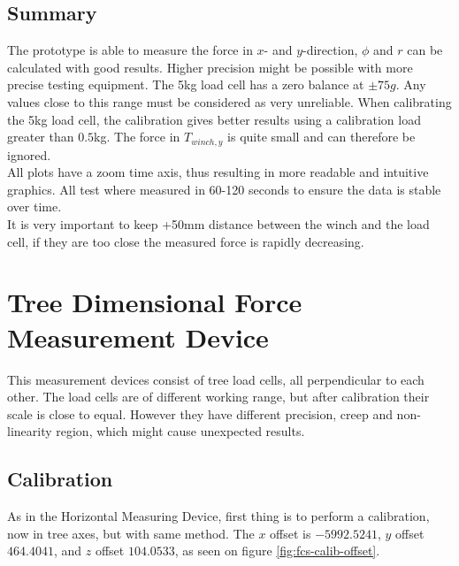 \newpage
\subsection{Summary}
The prototype is able to measure the force in $x$- and $y$-direction, $\phi$ and $r$ can be calculated with good results. Higher precision might be possible with more precise testing equipment.
The 5kg load cell has a zero balance at $\pm75g$. Any values close to this range must be considered as very unreliable. 
When calibrating the 5kg load cell, the calibration gives better results using a calibration load greater than $0.5$kg.
The force in $T_{winch,y}$ is quite small and can therefore be ignored.\\
All plots have a zoom time axis, thus resulting in more readable and intuitive graphics. All test where measured in 60-120 seconds to ensure the data is stable over time.\\
It is very important to keep +50mm distance between the winch and the load cell, if they are too close the measured force is rapidly decreasing. 






\newpage
\section{Tree Dimensional Force Measurement Device}
This measurement devices consist of tree load cells, all perpendicular to each other. The load cells are of different working range, but after calibration their scale is close to equal. However they have different precision, creep and non-linearity region, which might cause unexpected results.

\subsection{Calibration}
As in the Horizontal Measuring Device, first thing is to perform a calibration, now in tree axes, but with same method. The $x$ offset is $-5992.5241$, $y$ offset $464.4041$, and $z$ offset $104.0533$, as seen on figure \ref{fig:fcs-calib-offset}.\\

